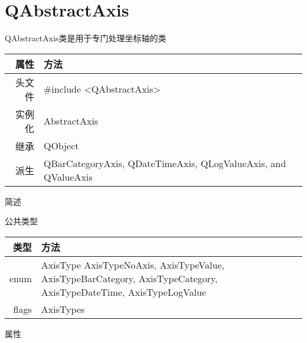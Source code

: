 \chapter{QAbstractAxis}

QAbstractAxis类是用于专门处理坐标轴的类

\begin{tabular}{|r|l|}
	\hline
	属性 & 方法 \\
	\hline
	头文件 & \#include <QAbstractAxis>\\      
	\hline
	实例化 & AbstractAxis\\      
	\hline
	继承&QObject \\
	\hline
	派生 & QBarCategoryAxis, QDateTimeAxis, QLogValueAxis, and QValueAxis \\
	\hline
\end{tabular}

简述

公共类型

\begin{tabular}{|r|l|}
\hline
类型 & 方法 \\
\hline
enum&	AxisType { AxisTypeNoAxis, AxisTypeValue, AxisTypeBarCategory,
      AxisTypeCategory, AxisTypeDateTime, AxisTypeLogValue }\\
\hline
flags&	AxisTypes\\
\hline
\end{tabular}

属性

